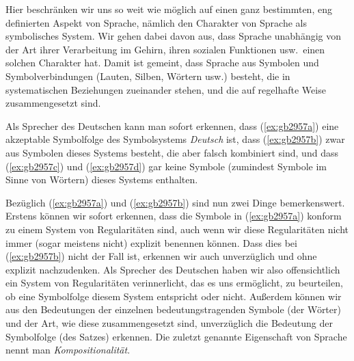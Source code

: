 Hier beschränken wir uns so weit wie möglich auf einen ganz bestimmten, eng definierten Aspekt von Sprache, nämlich den Charakter von Sprache als symbolisches System.
Wir gehen dabei davon aus, dass Sprache unabhängig von der Art ihrer Verarbeitung im Gehirn, ihren sozialen Funktionen usw.\ einen solchen Charakter hat.
Damit ist gemeint, dass Sprache aus Symbolen und Symbolverbindungen (Lauten, Silben, Wörtern usw.) besteht, die in systematischen Beziehungen zueinander stehen, und die auf regelhafte Weise zusammengesetzt sind.

Als Sprecher des Deutschen kann man \zB sofort erkennen, dass (\ref{ex:gb2957a}) eine akzeptable Symbolfolge des Symbolsystems \textit{Deutsch} ist, dass (\ref{ex:gb2957b}) zwar aus Symbolen dieses Systems besteht, die aber falsch kombiniert sind, und dass (\ref{ex:gb2957c}) und (\ref{ex:gb2957d}) gar keine Symbole (zumindest Symbole im Sinne von Wörtern) dieses Systems enthalten.

\begin{exe}
  \ex
  \begin{xlist}
  \end{xlist}
\end{exe}


Bezüglich (\ref{ex:gb2957a}) und (\ref{ex:gb2957b}) sind nun zwei Dinge bemerkenswert.
Erstens können wir sofort erkennen, dass die Symbole in (\ref{ex:gb2957a}) konform zu einem System von Regularitäten sind, auch wenn wir diese Regularitäten nicht immer (sogar meistens nicht) explizit benennen können.
Dass dies bei (\ref{ex:gb2957b}) nicht der Fall ist, erkennen wir auch unverzüglich und ohne explizit nachzudenken.
Als Sprecher des Deutschen haben wir also offensichtlich ein System von Regularitäten verinnerlicht, das es uns ermöglicht, zu beurteilen, ob eine Symbolfolge diesem System entspricht oder nicht.
Außerdem können wir aus den Bedeutungen der einzelnen bedeutungstragenden Symbole (der Wörter) und der Art, wie diese zusammengesetzt sind, unverzüglich die Bedeutung der Symbolfolge (des Satzes) erkennen.
Die zuletzt genannte Eigenschaft von Sprache nennt man \textit{Kompositionalität}.


